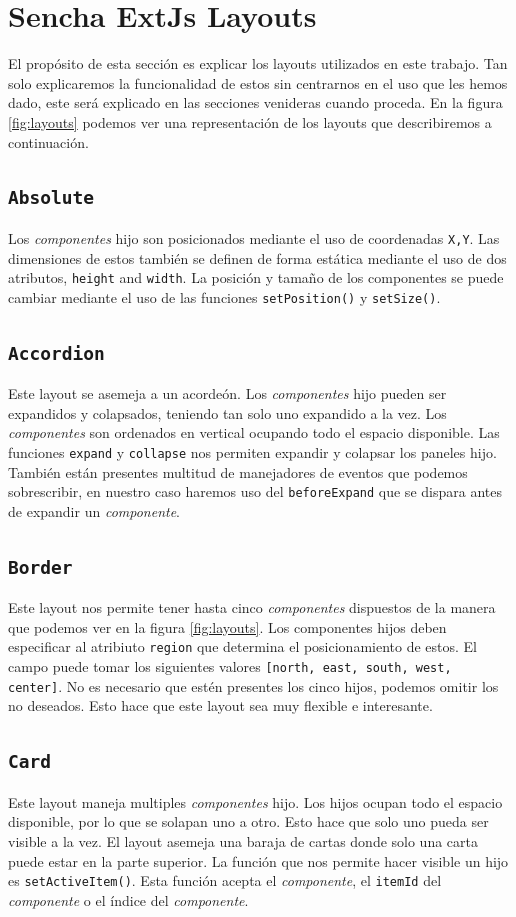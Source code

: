 \section{Sencha ExtJs Layouts}
	El propósito de esta sección es explicar los layouts utilizados en este trabajo. Tan solo explicaremos la funcionalidad de estos sin
	centrarnos en el uso que les hemos dado, este será explicado en las secciones venideras cuando proceda. En la figura \ref{fig:layouts} podemos
	ver una representación de los layouts que describiremos a continuación.
	\subsection{\texttt{Absolute}}
		Los \emph{componentes} hijo son posicionados mediante el uso de coordenadas \texttt{X,Y}. Las dimensiones de estos también se definen
		de forma estática mediante el uso de dos atributos, \texttt{height} and \texttt{width}. La posición y tamaño de los componentes se
		puede cambiar mediante el uso de las funciones \texttt{setPosition()} y \texttt{setSize()}.
	\subsection{\texttt{Accordion}}
		Este layout se asemeja a un acordeón. Los \emph{componentes} hijo pueden ser expandidos y colapsados, teniendo tan solo uno expandido
		a la vez. Los \emph{componentes} son ordenados en vertical ocupando todo el espacio disponible. Las funciones \texttt{expand} y
		\texttt{collapse} nos permiten expandir y colapsar los paneles hijo. También están presentes multitud de manejadores de eventos que
		podemos sobrescribir, en nuestro caso haremos uso del \texttt{beforeExpand} que se dispara antes de expandir un \emph{componente}. 
	\subsection{\texttt{Border}}
		Este layout nos permite tener hasta cinco \emph{componentes} dispuestos de la manera que podemos ver en la figura \ref{fig:layouts}.
		Los componentes hijos deben especificar al atribiuto \texttt{region} que determina el posicionamiento de estos. El campo puede tomar
		los siguientes valores \texttt{[north, east, south, west, center]}. No es necesario que estén presentes los cinco hijos, podemos
		omitir los no deseados. Esto hace que este layout sea muy flexible e interesante.
	\subsection{\texttt{Card}}
		Este layout maneja multiples \emph{componentes} hijo. Los hijos ocupan todo el espacio disponible, por lo que se solapan uno a otro.
		Esto hace que solo uno pueda ser visible a la vez. El layout asemeja una baraja de cartas donde solo una carta puede estar en la parte
		superior. La función que nos permite hacer visible un hijo es \texttt{setActiveItem()}. Esta función acepta el \emph{componente}, el
		\texttt{itemId} del \emph{componente} o el índice del \emph{componente}.
